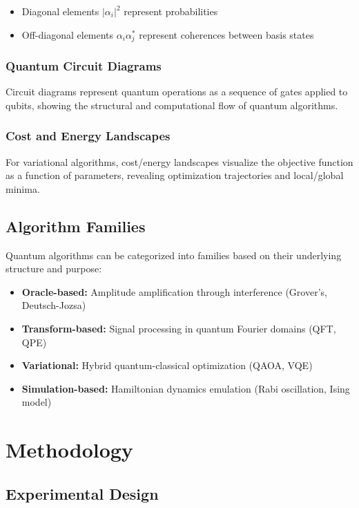 \documentclass[12pt,a4paper]{article}
\begin{document}
\begin{itemize}
	\item Diagonal elements $|\alpha_i|^2$ represent probabilities
	\item Off-diagonal elements $\alpha_i\alpha_j^*$ represent coherences between basis states
\end{itemize}

\subsubsection{Quantum Circuit Diagrams}
Circuit diagrams represent quantum operations as a sequence of gates applied to qubits, showing the structural and computational flow of quantum algorithms.

\subsubsection{Cost and Energy Landscapes}
For variational algorithms, cost/energy landscapes visualize the objective function as a function of parameters, revealing optimization trajectories and local/global minima.

\subsection{Algorithm Families}

Quantum algorithms can be categorized into families based on their underlying structure and purpose:

\begin{itemize}
	\item \textbf{Oracle-based:} Amplitude amplification through interference (Grover's, Deutsch-Jozsa)
	\item \textbf{Transform-based:} Signal processing in quantum Fourier domains (QFT, QPE)
	\item \textbf{Variational:} Hybrid quantum-classical optimization (QAOA, VQE)
	\item \textbf{Simulation-based:} Hamiltonian dynamics emulation (Rabi oscillation, Ising model)
\end{itemize}

\newpage

\section{Methodology}

\subsection{Experimental Design}
\end{document}
